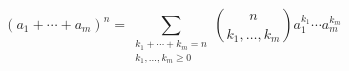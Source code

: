 

\setcounter{section}{4}
\setcounter{subsection}{2}
\setcounter{dfn}{2}

\begin{thm}
\[
(a_1 + \cdots + a_m)^n = \sum_{\substack{k_1 + \cdots + k_m = n\\ k_1, \ldots, k_m \ge 0}}
\binom{n}{k_1, \ldots, k_m} a_1^{k_1} \cdots a_m^{k_m}
\]
\end{thm}

